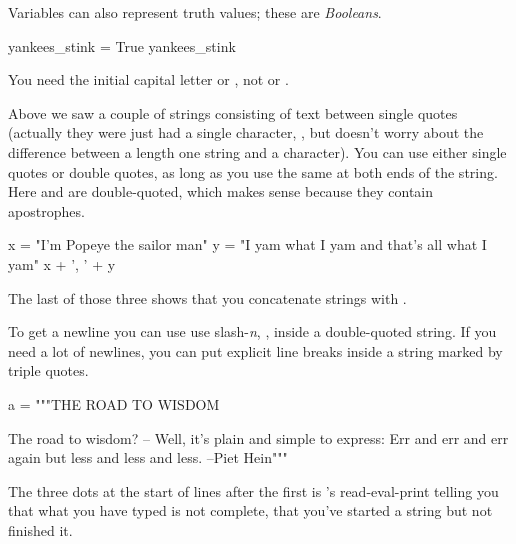 
Variables can also represent truth values; these are \textit{Booleans}.
\begin{pythonconsole}
yankees_stink = True
yankees_stink
\end{pythonconsole}
\noindent You need the initial capital letter\Dash
{}
or , not
or .
 
Above we saw a couple of strings consisting of text between single quotes
(actually they were just had a single character, ,
but \python{} doesn't worry about the difference between a length one
string and a character).
You can use either single quotes or double quotes, as long as you use
the same at both ends of the string. 
Here  and 
are double-quoted, which makes sense because they contain apostrophes. 
\begin{pythonconsole}
x = "I'm Popeye the sailor man"
y = "I yam what I yam and that's all what I yam"
x + ', ' + y
\end{pythonconsole}
\noindent The last of those three shows that you concatenate strings with 
\inlinecode{+}. 

To get a newline you can use use slash-\textit{n}, \inlinecode{\\n}, 
inside a double-quoted string.
If you need a lot of newlines, 
you can put explicit line breaks inside a string marked by triple quotes.
\begin{pythonconsole}
a = """THE ROAD TO WISDOM
 
The road to wisdom?
-- Well, it's plain
and simple to express:
Err
and err
and err again
but less
and less
and less. --Piet Hein"""
\end{pythonconsole}
\noindent 
The three dots at the start of lines after the first
is \python's
read-eval-print telling you that what you have typed is not complete,
that you've started a string but not finished it.

